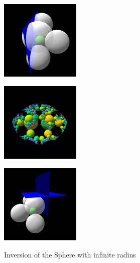 \begin{figure}[h!tbp]
 \begin{minipage}[]{0.49\hsize}
  \begin{minipage}[]{0.24\hsize}
   \center
   \includegraphics[width=1.5in, height=1.5in, keepaspectratio]{../img/klein/3diis/infSphereGen.pdf}
   \label{fig:infSphereGen}
  \end{minipage}
  \hspace*{\fill}
  \begin{minipage}[]{0.24\hsize}
   \center
   \includegraphics[width=1.5in, height=1.5in, keepaspectratio]{../img/klein/3diis/infSphereOrbit.pdf}
   \label{fig:infSphereOrb}
  \end{minipage}
  \hspace*{\fill}
  \caption{Inversion of the Sphere with infinite radius}
  \label{fig:infSphere}
 \end{minipage}
 \begin{minipage}[]{0.49\hsize}
  \begin{minipage}[]{0.24\hsize}
   \center
   \includegraphics[width=1.5in, height=1.5in, keepaspectratio]{../img/klein/3diis/rotationGen.pdf}
   \label{fig:rotationGen}
  \end{minipage}
  \hspace*{\fill}

\end{minipage}
\end{figure}
